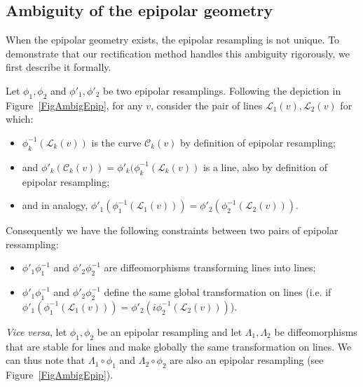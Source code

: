 \documentclass{ipol}
\newcommand{\LineE}[1]{\ensuremath{\mathcal{L}_{#1}}}
\newcommand{\LineO}{\LineE{1}}
\newcommand{\LineT}{\LineE{2}}
\newcommand{\LineK}{\LineE{k}}
\newcommand{\CurveE}[1]{\ensuremath{\mathcal{C}_{#1}}}
\newcommand{\CurveO}{\CurveE{1}}
\newcommand{\CurveT}{\CurveE{2}}
\newcommand{\CurveK}{\CurveE{k}}
\begin{document}


\subsection{Ambiguity of the epipolar geometry}

When the epipolar geometry exists, the epipolar resampling is not unique. To demonstrate that our rectification method handles this ambiguity rigorously, we first describe it formally.


Let $\phi_1,\phi_2$ and  $\phi'_1,\phi'_2$ be two epipolar resamplings. Following the depiction in Figure~\ref{FigAmbigEpip}, for any $v$, consider the pair of lines $\LineO(v),\LineT(v)$ for which:

\begin{itemize}
   \item  $\phi_k^{-1}(\LineK(v))$ is the curve $\CurveK(v)$ by definition of epipolar resampling;
   \item  and $\phi'_k (\CurveK(v)) = \phi'_k ( \phi_k^{-1}(\LineK(v))$ is a line, also by definition of epipolar resampling;
   \item and in analogy, $\phi'_1 ( \phi_1^{-1}(\LineO(v))) = \phi'_2 ( \phi_2^{-1}(\LineT(v)))$.
\end{itemize}

Consequently we have the following constraints between two pairs of epipolar ressampling:

\begin{itemize}
   \item  $\phi'_1 \phi_1^{-1}$  and $\phi'_2 \phi_2^{-1}$ are diffeomorphisms transforming lines into lines;
   \item $\phi'_1 \phi_1^{-1}$  and $\phi'_2 \phi_2^{-1}$ define the same global transformation on lines
        (i.e. if $\phi'_1 (\phi_1^{-1} (\LineO(v))) = \phi'_2 (i\phi_2^{-1}(\LineT(v)))$).
\end{itemize}



\emph{Vice versa}, let  $\phi_1,\phi_2$ be an epipolar resampling and let $\Lambda_1,\Lambda_2$ 
be diffeomorphisms  that are stable for lines and make globally the same transformation on lines. We can thus note that $\Lambda_1 \circ \phi_1$ and  $\Lambda_2 \circ \phi_2$ are also an epipolar resampling (see Figure~\ref{FigAmbigEpip}).
\end{document}
